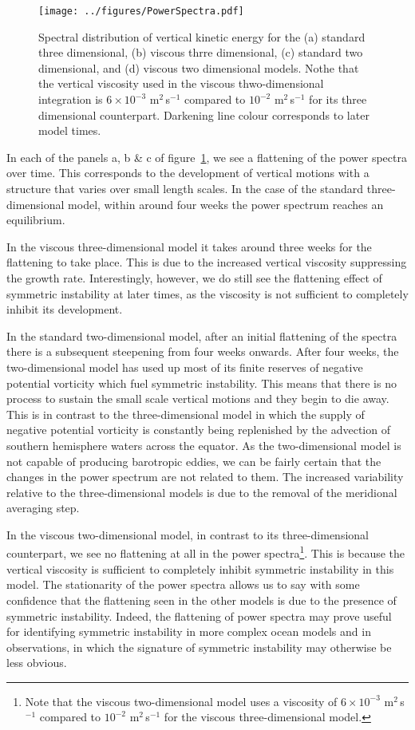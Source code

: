     \begin{figure} 
        \centering
        \texttt{[image: ../figures/PowerSpectra.pdf]}
        \caption{Spectral distribution of vertical kinetic energy for the (a) standard three dimensional, (b) viscous thrre dimensional, (c) standard two dimensional, and (d) viscous two dimensional models. Nothe that the vertical viscosity used in the viscous thwo-dimensional integration is $6 \times 10^{-3}$ m$^2\,$s$^{-1}$ compared to $10^{-2}$ m$^2\,$s$^{-1}$ for its three dimensional counterpart. Darkening line colour corresponds to later model times.}
        \label{fig:SpectralEnergyDensity}
    \end{figure}

    In each of the panels a, b \& c of figure~\ref{fig:SpectralEnergyDensity}, we see a flattening of the power spectra over time. This corresponds to the development of vertical motions with a structure that varies over small length scales. In the case of the standard three-dimensional model, within around four weeks the power spectrum reaches an equilibrium.

    In the viscous three-dimensional model it takes around three weeks for the flattening to take place. This is due to the increased vertical viscosity suppressing the growth rate. Interestingly, however, we do still see the flattening effect of symmetric instability at later times, as the viscosity is not sufficient to completely inhibit its development.

    In the standard two-dimensional model, after an initial flattening of the spectra there is a subsequent steepening from four weeks onwards. After four weeks, the two-dimensional model has used up most of its finite reserves of negative potential vorticity which fuel symmetric instability. This means that there is no process to sustain the small scale vertical motions and they begin to die away. This is in contrast to the three-dimensional model in which the supply of negative potential vorticity is constantly being replenished by the advection of southern hemisphere waters across the equator. As the two-dimensional model is not capable of producing barotropic eddies, we can be fairly certain that the changes in the power spectrum are not related to them. The increased variability relative to the three-dimensional models is due to the removal of the meridional averaging step.

    In the viscous two-dimensional model, in contrast to its three-dimensional counterpart, we see no flattening at all in the power spectra\footnote{Note that the viscous two-dimensional model uses a viscosity of $6 \times 10^{-3}$ m$^2$\,s$^{-1}$ compared to $10^{-2}$ m$^2$\,s$^{-1}$ for the viscous three-dimensional model.}. This is because the vertical viscosity is sufficient to completely inhibit symmetric instability in this model. The stationarity of the power spectra allows us to say with some confidence that the flattening seen in the other models is due to the presence of symmetric instability. Indeed, the flattening of power spectra may prove useful for identifying symmetric instability in more complex ocean models and in observations, in which the signature of symmetric instability may otherwise be less obvious.
    
